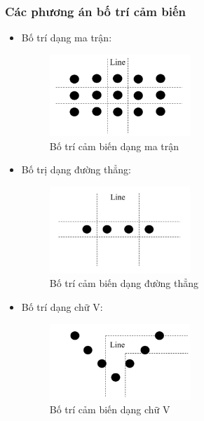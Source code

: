             \subsubsection{Các phương án bố trí cảm biến}
                \begin{itemize}
                    \item Bố trí dạng ma trận:
                    \begin{figure}[H]
                        \centering
                        \includegraphics[width=0.5\textwidth]{pictures/chapter2/chapter2_pic_7.png}
                        \caption{Bố trí cảm biến dạng ma trận}
                        \label{fig:matrix_sensor_layout}
                    \end{figure}
                    \item Bố trị dạng đường thẳng:
                    \begin{figure}[H]
                        \centering
                        \includegraphics[width=0.5\textwidth]{pictures/chapter2/chapter2_pic_8.png}
                        \caption{Bố trí cảm biến dạng đường thẳng}
                        \label{fig:line_sensor_layout}
                    \end{figure}
                    \item Bố trí dạng chữ V:
                    \begin{figure}[H]
                        \centering
                        \includegraphics[width=0.5\textwidth]{pictures/chapter2/chapter2_pic_9.png}
                        \caption{Bố trí cảm biến dạng chữ V}
                        \label{fig:v_sensor_layout}
                    \end{figure}
                \end{itemize}
